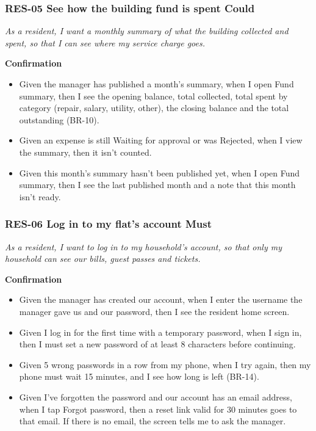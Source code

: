 \documentclass[11pt,a4paper]{report}
\begin{document}
\subsubsection*{RES-05 \textperiodcentered{} See how the building fund is spent \textperiodcentered{} Could}

\emph{As a resident, I want a monthly summary of what the building collected and spent, so that I can see where my service charge goes.}

\medskip\noindent\textbf{Confirmation}\par

\begin{itemize}
  \item Given the manager has published a month's summary, when I open Fund summary, then I see the opening balance, total collected, total spent by category (repair, salary, utility, other), the closing balance and the total outstanding (BR-10).
  \item Given an expense is still Waiting for approval or was Rejected, when I view the summary, then it isn't counted.
  \item Given this month's summary hasn't been published yet, when I open Fund summary, then I see the last published month and a note that this month isn't ready.
\end{itemize}

\subsubsection*{RES-06 \textperiodcentered{} Log in to my flat's account \textperiodcentered{} Must}

\emph{As a resident, I want to log in to my household's account, so that only my household can see our bills, guest passes and tickets.}

\medskip\noindent\textbf{Confirmation}\par

\begin{itemize}
  \item Given the manager has created our account, when I enter the username the manager gave us and our password, then I see the resident home screen.
  \item Given I log in for the first time with a temporary password, when I sign in, then I must set a new password of at least 8 characters before continuing.
  \item Given 5 wrong passwords in a row from my phone, when I try again, then my phone must wait 15 minutes, and I see how long is left (BR-14).
  \item Given I've forgotten the password and our account has an email address, when I tap Forgot password, then a reset link valid for 30 minutes goes to that email. If there is no email, the screen tells me to ask the manager.
\end{itemize}
\end{document}

